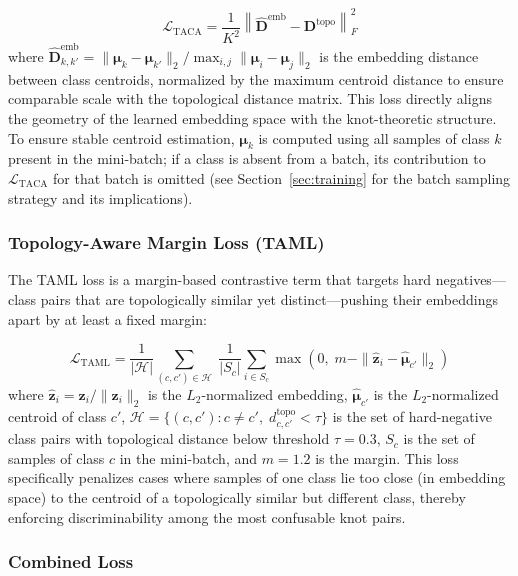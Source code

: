 \documentclass[preprint,review,12pt]{elsarticle}
\begin{document}
\begin{equation}
\mathcal{L}_{\text{TACA}} = \frac{1}{K^2}\left\|\hat{\mathbf{D}}^{\text{emb}} - \mathbf{D}^{\text{topo}}\right\|_F^2
\end{equation}
where $\hat{\mathbf{D}}^{\text{emb}}_{k,k'} = \|\boldsymbol{\mu}_k - \boldsymbol{\mu}_{k'}\|_2 / \max_{i,j}\|\boldsymbol{\mu}_i - \boldsymbol{\mu}_j\|_2$ is the embedding distance between class centroids, normalized by the maximum centroid distance to ensure comparable scale with the topological distance matrix. This loss directly aligns the geometry of the learned embedding space with the knot-theoretic structure. To ensure stable centroid estimation, $\boldsymbol{\mu}_k$ is computed using all samples of class $k$ present in the mini-batch; if a class is absent from a batch, its contribution to $\mathcal{L}_{\text{TACA}}$ for that batch is omitted (see Section~\ref{sec:training} for the batch sampling strategy and its implications).

\subsubsection{Topology-Aware Margin Loss (TAML)}

The TAML loss is a margin-based contrastive term that targets hard negatives---class pairs that are topologically similar yet distinct---pushing their embeddings apart by at least a fixed margin:

\begin{equation}
\mathcal{L}_{\text{TAML}} = \frac{1}{|\mathcal{H}|}\sum_{(c,c') \in \mathcal{H}}\; \frac{1}{|S_c|}\sum_{i \in S_c} \max\left(0,\; m - \|\hat{\mathbf{z}}_i - \hat{\boldsymbol{\mu}}_{c'}\|_2\right)
\end{equation}
where $\hat{\mathbf{z}}_i = \mathbf{z}_i / \|\mathbf{z}_i\|_2$ is the $L_2$-normalized embedding, $\hat{\boldsymbol{\mu}}_{c'}$ is the $L_2$-normalized centroid of class $c'$, $\mathcal{H} = \{(c,c') : c \neq c',\; d^{\text{topo}}_{c,c'} < \tau\}$ is the set of hard-negative class pairs with topological distance below threshold $\tau = 0.3$, $S_c$ is the set of samples of class $c$ in the mini-batch, and $m = 1.2$ is the margin. This loss specifically penalizes cases where samples of one class lie too close (in embedding space) to the centroid of a topologically similar but different class, thereby enforcing discriminability among the most confusable knot pairs.

\subsubsection{Combined Loss}
\end{document}
